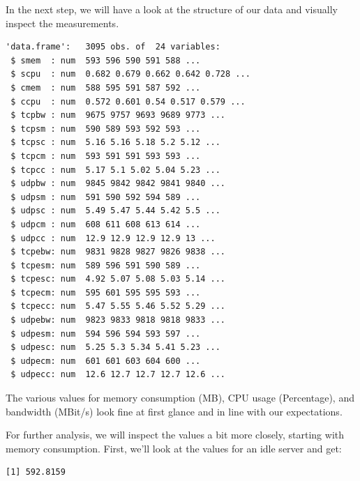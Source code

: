 In the next step, we will have a look at the structure of our data and
visually inspect the measurements.

\begin{Shaded}
\begin{Highlighting}[]
\end{Highlighting}
\end{Shaded}

\begin{verbatim}
'data.frame':   3095 obs. of  24 variables:
 $ smem  : num  593 596 590 591 588 ...
 $ scpu  : num  0.682 0.679 0.662 0.642 0.728 ...
 $ cmem  : num  588 595 591 587 592 ...
 $ ccpu  : num  0.572 0.601 0.54 0.517 0.579 ...
 $ tcpbw : num  9675 9757 9693 9689 9773 ...
 $ tcpsm : num  590 589 593 592 593 ...
 $ tcpsc : num  5.16 5.16 5.18 5.2 5.12 ...
 $ tcpcm : num  593 591 591 593 593 ...
 $ tcpcc : num  5.17 5.1 5.02 5.04 5.23 ...
 $ udpbw : num  9845 9842 9842 9841 9840 ...
 $ udpsm : num  591 590 592 594 589 ...
 $ udpsc : num  5.49 5.47 5.44 5.42 5.5 ...
 $ udpcm : num  608 611 608 613 614 ...
 $ udpcc : num  12.9 12.9 12.9 12.9 13 ...
 $ tcpebw: num  9831 9828 9827 9826 9838 ...
 $ tcpesm: num  589 596 591 590 589 ...
 $ tcpesc: num  4.92 5.07 5.08 5.03 5.14 ...
 $ tcpecm: num  595 601 595 595 593 ...
 $ tcpecc: num  5.47 5.55 5.46 5.52 5.29 ...
 $ udpebw: num  9823 9833 9818 9818 9833 ...
 $ udpesm: num  594 596 594 593 597 ...
 $ udpesc: num  5.25 5.3 5.34 5.41 5.23 ...
 $ udpecm: num  601 601 603 604 600 ...
 $ udpecc: num  12.6 12.7 12.7 12.7 12.6 ...
\end{verbatim}

The various values for memory consumption (MB), CPU usage (Percentage), and
bandwidth (MBit/s) look fine at first glance and in line with our expectations.

For further analysis, we will inspect the values a bit more
closely, starting with memory consumption. First, we'll look at the values for an idle server and get:

\begin{Shaded}
\begin{Highlighting}[]
\SpecialCharTok{\$}
\end{Highlighting}
\end{Shaded}

\begin{verbatim}
[1] 592.8159
\end{verbatim}

\begin{Shaded}
\begin{Highlighting}[]
\SpecialCharTok{\$}
\end{Highlighting}
\end{Shaded}

